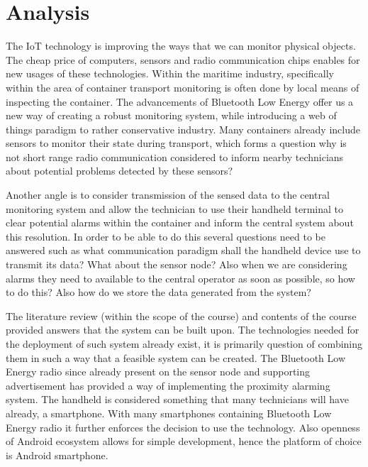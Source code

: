 \chapter{Analysis}
\label{cha:analysis}

The IoT technology is improving the ways that we can monitor physical objects. The cheap price of computers, sensors and radio communication chips enables for new usages of these technologies. Within the maritime industry, specifically within the area of container transport monitoring is often done by local means of inspecting the container. The advancements of Bluetooth Low Energy offer us a new way of creating a robust monitoring system, while introducing a web of things paradigm to rather conservative industry. Many containers already include sensors to monitor their state during transport, which forms a question why is not short range radio communication considered to inform nearby technicians about potential problems detected by these sensors? 

\bigskip

Another angle is to consider transmission of the sensed data to the central monitoring system and allow the technician to use their handheld terminal to clear potential alarms within the container and inform the central system about this resolution. In order to be able to do this several questions need to be answered such as what communication paradigm shall the handheld device use to transmit its data? What about the sensor node? Also when we are considering alarms they need to available to the central operator as soon as possible, so how to do this? Also how do we store the data generated from the system?

\bigskip

The literature review (within the scope of the course) and contents of the course provided answers that the system can be built upon. The technologies needed for the deployment of such system already exist, it is primarily question of combining them in such a way that a feasible system can be created. The Bluetooth Low Energy radio since already present on the sensor node and supporting advertisement has provided a way of implementing the proximity alarming system. The handheld is considered something that many technicians will have already, a smartphone. With many smartphones containing Bluetooth Low Energy radio it further enforces the decision to use the technology. Also openness of Android ecosystem allows for simple development, hence the platform of choice is Android smartphone.

